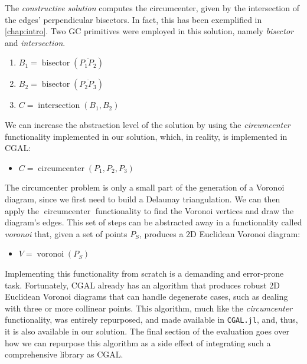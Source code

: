 The \textit{constructive solution} computes the circumcenter, given by the
intersection of the edges' perpendicular bisectors.  In fact, this has been
exemplified in \cref{chap:intro}.  Two \ac{GC} primitives were employed in this
solution, namely \textit{bisector} and \textit{intersection}.

\begin{enumerate}
  \item $B_1 = \operatorname{bisector}\left(\overline{P_1 P_2}\right)$
  \item $B_2 = \operatorname{bisector}\left(\overline{P_2 P_3}\right)$
  \item $C = \operatorname{intersection}\left(B_1, B_2\right)$
\end{enumerate}

We can increase the abstraction level of the solution by using the
\textit{circumcenter} functionality implemented in our solution, which, in
reality, is implemented in \ac{CGAL}:

\begin{itemize}
  \item[] $C = \operatorname{circumcenter}\left(P_1, P_2, P_3\right)$
\end{itemize}

The circumcenter problem is only a small part of the generation of a Voronoi
diagram, since we first need to build a Delaunay triangulation.  We can then 
apply the $\operatorname{circumcenter}$ functionality to find the Voronoi
vertices and draw the diagram's edges.  This set of steps can be abstracted away
in a functionality called \textit{voronoi} that, given a set of points $P_S$,
produces a 2D Euclidean Voronoi diagram:

\begin{itemize}
  \item[] $V = \operatorname{voronoi}\left(P_S\right)$
\end{itemize}

Implementing this functionality from scratch is a demanding and error-prone
task.  Fortunately, \ac{CGAL} already has an algorithm that produces robust 2D
Euclidean Voronoi diagrams that can handle degenerate cases, such as dealing
with three or more collinear points.  This algorithm, much like the
\textit{circumcenter} functionality, was entirely repurposed, and made available
in \texttt{CGAL.jl}, and, thus, it is also available in our solution.  The final
section of the evaluation goes over how we can repurpose this algorithm as a
side effect of integrating such a comprehensive library as \ac{CGAL}.
